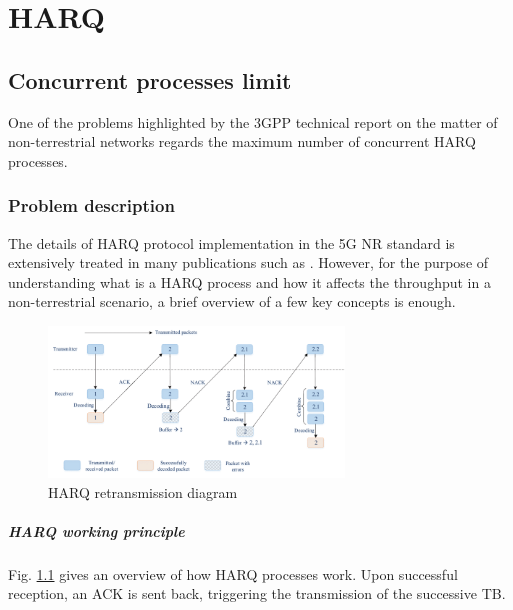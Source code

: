 
\chapter{HARQ}
\label{chp:analysis}

\section{Concurrent processes limit}

One of the problems highlighted by the \ac{3GPP} technical report \cite{3gpp-tr-38.811} on the matter of non-terrestrial networks regards the maximum number of concurrent \ac{HARQ} processes. 

\subsection{Problem description}
The details of \ac{HARQ} protocol implementation in the 5G \ac{NR} standard is extensively treated in many publications such as \cite{harq-wireless-communications-survey}. However, for the purpose of understanding what is a \ac{HARQ} process and how it affects the throughput in a non-terrestrial scenario, a brief overview of a few key concepts is enough.

\begin{figure}[ht]
    \centering
    \includegraphics[width=0.7\textwidth]{res/harq-retx-scheme.png}
    \caption{\ac{HARQ} retransmission diagram \cite{harq-wireless-communications-survey}}
    \label{fig:harq_retx_scheme}
\end{figure}


\paragraph{HARQ working principle}
Fig. \ref{fig:harq_retx_scheme} gives an overview of how \ac{HARQ} processes work. Upon successful reception, an \ac{ACK} is sent back, triggering the transmission of the successive \ac{TB}. 


